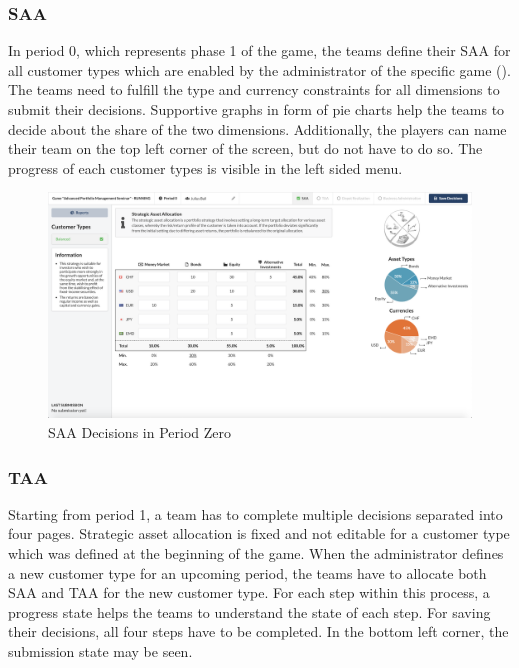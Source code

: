 \subsubsection{SAA}
In period 0, which represents phase 1 of the game, the teams define their SAA for all customer types which are enabled by the administrator of the specific game (). The teams need to fulfill the type and currency constraints for all dimensions to submit their decisions. Supportive graphs in form of pie charts help the teams to decide about the share of the two dimensions. Additionally, the players can name their team on the top left corner of the screen, but do not have to do so. The progress of each customer types is visible in the left sided menu.
\begin{figure}[h!]
  \centering
  \includegraphics[scale=0.2]{img/application-overview/teams/02_period_zero_decisions.png}
  \caption{SAA Decisions in Period Zero}
  \label{fig:saa_decisions}
\end{figure}

\subsubsection{TAA}
Starting from period 1, a team has to complete multiple decisions separated into four pages. Strategic asset allocation is fixed and not editable for a customer type which was defined at the beginning of the game. When the administrator defines a new customer type for an upcoming period, the teams have to allocate both SAA and TAA for the new customer type. For each step within this process, a progress state helps the teams to understand the state of each step. For saving their decisions, all four steps have to be completed. In the bottom left corner, the submission state may be seen. \\

